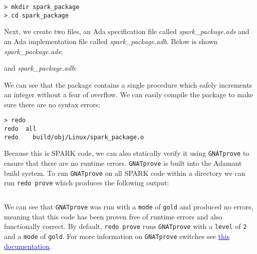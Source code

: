 \vspace{5mm} %
\begin{verbatim}
> mkdir spark_package 
> cd spark_package 
\end{verbatim}
\vspace{5mm} %

Next, we create two files, an Ada specification file called \textit{spark\_package.ads} and an Ada implementation file called \textit{spark\_package.adb}. Below is shown \textit{spark\_package.ads}:


and \textit{spark\_package.adb}:


We can see that the package contains a single procedure which safely increments an integer without a fear of overflow. We can easily compile the package to make sure there are no syntax errors:

\vspace{5mm} %
\begin{verbatim}
> redo
redo  all
redo    build/obj/Linux/spark_package.o
\end{verbatim}
\vspace{5mm} %

Because this is SPARK code, we can also statically verify it using \texttt{GNATprove} to ensure that there are no runtime errors. \texttt{GNATprove} is built into the Adamant build system. To run \texttt{GNATprove} on all SPARK code within a directory we can run \texttt{redo prove} which produces the following output:

\vspace{5mm} %
\inputminted{text}{../example_architecture/spark_package_no_config/output.txt}
\vspace{5mm} %

We can see that \texttt{GNATprove} was run with a \texttt{mode} of \texttt{gold} and produced no errors, meaning that this code has been proven free of runtime errors and also functionally correct. By default, \texttt{redo prove} runs \texttt{GNATprove} with a \texttt{level} of \texttt{2} and a \texttt{mode} of \texttt{gold}. For more information on \texttt{GNATprove} switches see \href{https://docs.adacore.com/spark2014-docs/html/ug/en/source/how_to_run_gnatprove.html#running-gnatprove-from-the-command-line}{\textcolor{blue}{this documentation}}. \\

